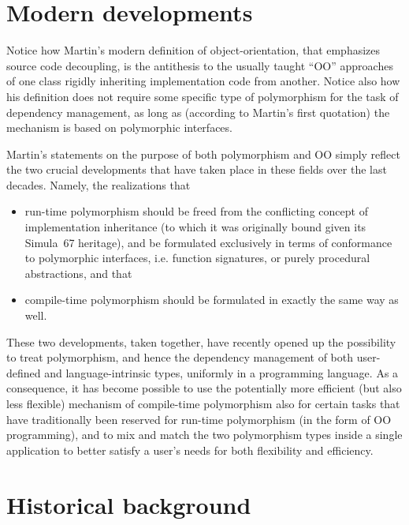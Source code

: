 \documentclass[11pt,oneside]{report}
\begin{document}
\section{Modern developments}

Notice how Martin's modern definition of object-orientation, that
emphasizes source code decoupling, is the antithesis to the usually
taught ``OO'' approaches of one class rigidly inheriting
implementation code from another. Notice also how his definition does
not require some specific type of polymorphism for the task of
dependency management, as long as (according to Martin's first
quotation) the mechanism is based on polymorphic interfaces.

Martin's statements on the purpose of both polymorphism and OO simply
reflect the two crucial developments that have taken place in these
fields over the last decades. Namely, the realizations that
\begin{itemize}
\item
  run-time polymorphism should be freed from the conflicting concept
  of implementation inheritance (to which it was originally bound
  given its Simula~67 heritage), and be formulated exclusively in
  terms of conformance to polymorphic interfaces, i.e. function
  signatures, or purely procedural abstractions, and that
\item
  compile-time polymorphism should be formulated in exactly the same
  way as well.
\end{itemize}

These two developments, taken together, have recently opened up the
possibility to treat polymorphism, and hence the dependency management
of both user-defined and language-intrinsic types, uniformly in a
programming language. As a consequence, it has become possible to use
the potentially more efficient (but also less flexible) mechanism of
compile-time polymorphism also for certain tasks that have
traditionally been reserved for run-time polymorphism (in the form of
OO programming), and to mix and match the two polymorphism types
inside a single application to better satisfy a user's needs for both
flexibility and efficiency.

\section{Historical background}
\end{document}
